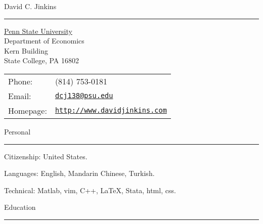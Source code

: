 \documentclass[letterpaper]{article}
\def\name{David C. Jinkins}
\renewenvironment{itemize}{
    \begin{list}{}{
            \setlength{\leftmargin}{1.5em}
        }
    }{
    \end{list}
}
\begin{document}
{\huge \name}
\hrule 


\vspace{4mm}

\begin{minipage}{0.45\linewidth}
    \hspace*{5mm}\href{http://www.psu.edu/}{Penn State University} \\
    \hspace*{5mm}Department of Economics \\
    \hspace*{5mm}Kern Building \\
    \hspace*{5mm}State College, PA 16802
\end{minipage}
\begin{minipage}{0.45\linewidth}
    \begin{tabular}{ll}
        Phone: & (814) 753-0181 \\
        Email: & \href{mailto:dcj138@psu.edu}{\tt dcj138@psu.edu} \\
        Homepage: & \href{http://www.davidjinkins.com}{\tt http://www.davidjinkins.com} \\
    \end{tabular}
\end{minipage}


\vspace{7mm}
{\Large Personal}
\vspace{1mm}
\hrule

\begin{itemize}
    \item Citizenship: United States.
    \item Languages: English, Mandarin Chinese, Turkish.
    \item Technical: Matlab, vim, C++, \LaTeX, Stata, html, css.
\end{itemize}

\vspace{4mm}
{\Large Education}
\vspace{1mm}
\hrule
\end{document}
